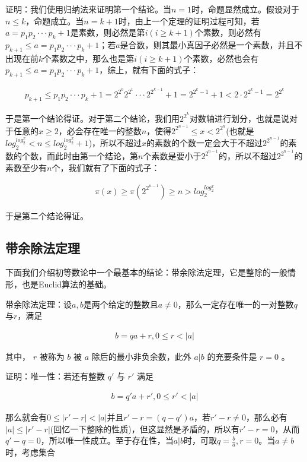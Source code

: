 \documentclass[12pt, a4paper, oneside]{ctexart}
\begin{document}
证明：我们使用归纳法来证明第一个结论。当$n=1$时，命题显然成立。假设对于$n\leqslant k$，命题成立。当$n=k+1$时，由上一个定理的证明过程可知，若$a=p_1p_2\cdot\cdot\cdot p_k+1$是素数，则必然是第$i(i\geqslant k+1)$个素数，则必然有$p_{k+1}\leqslant a=p_1p_2\cdot\cdot\cdot p_k+1$；若$a$是合数，则其最小真因子必然是一个素数，并且不出现在前$k$个素数之中，那么也是第$i(i\geqslant k+1)$个素数，必然也会有$p_{k+1}\leqslant a=p_1p_2\cdot\cdot\cdot p_k+1$，综上，就有下面的式子：

$$\begin{align*}
p_{k+1}\leqslant p_1p_2\cdot\cdot\cdot p_k+1=2^{2^0}2^{2^1}\cdot\cdot\cdot2^{2^{k-1}}+1=2^{2^k-1}+1<2\cdot2^{2^k-1}=2^{2^k}
\end{align*}$$

于是第一个结论得证。对于第二个结论，我们用$2^{2^k}$对数轴进行划分，也就是说对于任意的$x\geqslant2$，必会存在唯一的整数$n$，使得$2^{2^{n-1}}\leqslant x<2^{2^n}$(也就是$log_2^{log_2^x}< n\leqslant log_2^{log_2^x}+1$)，所以不超过$x$的素数的个数一定会大于不超过$2^{2^{n-1}}$的素数的个数，而此时由第一个结论，第$n$个素数是要小于$2^{2^{n-1}}$的，所以不超过$2^{2^{n-1}}$的素数至少有$n$个，我们就有了下面的式子：

$$\begin{align*}
\pi(x)\geqslant\pi(2^{2^{n-1}})\geqslant n>log_2^{log_2^x}
\end{align*}$$

于是第二个结论得证。

\subsection*{带余除法定理}

下面我们介绍初等数论中一个最基本的结论：带余除法定理，它是整除的一般情形，也是Euclid算法的基础。

带余除法定理：设$a,b$是两个给定的整数且$a\neq0$，那么一定存在唯一的一对整数$q$与$r$，满足

$$\begin{align*}
b=qa+r, 0\leqslant r<|a|
\end{align*}$$

其中， $r$ 被称为 $b$ 被 $a$ 除后的最小非负余数，此外 $a|b$ 的充要条件是 $r=0$ 。

证明：唯一性：若还有整数 $q'$ 与 $r'$ 满足

$$\begin{align*}
b=q'a+r', 0\leqslant r'<|a|
\end{align*}$$

那么就会有$0\leqslant |r'-r|<|a|$并且$r'-r=(q-q')a$，若$r'-r\neq0$，那么必有$|a|\leqslant |r'-r|$(回忆一下整除的性质)，但这显然是矛盾的，所以有$r'-r=0$，从而$q'-q=0$，所以唯一性成立。至于存在性，当$a|b$时，可取$q=\frac{b}{a},r=0$。当$a\neq b$时，考虑集合
\end{document}

